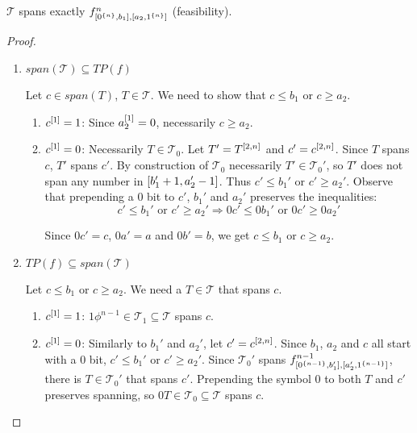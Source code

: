 \begin{theorem}
$\mathcal{T}$ spans exactly
$f^{n}_{[0^{\{n\}}, b_1], [a_2, 1^{\{n\}}]}$ (feasibility).
\end{theorem}

\begin{proof}

\hfill %
\begin{enumerate}
\item{$span(\mathcal{T}) \subseteq TP(f)$}

Let $c \in span(T)$, $T \in \mathcal{T}$.
We need to show that $c \leq b_1$ or $c \geq a_2$.

\begin{enumerate}
\item $c^{[1]} = 1$: Since $a_2^{[1]} = 0$,
necessarily $c \geq a_2$.

\item $c^{[1]} = 0$: Necessarily $T \in \mathcal{T}_0$.
Let $T' = T^{[2, n]}$ and $c' = c^{[2, n]}$.
Since $T$ spans $c$, $T'$ spans $c'$.
By construction of $\mathcal{T}_0$
necessarily $T' \in \mathcal{T}_0'$,
so $T'$ does not span any number
in $[b_1' + 1, a_2' - 1]$.
Thus $c' \leq b_1'$ or $c' \geq a_2'$.
Observe that prepending a $0$ bit
to $c'$, $b_1'$ and $a_2'$
preserves the inequalities:
\[
c' \leq b_1' \text{ or } c' \geq a_2'
\Rightarrow
0 c' \leq 0 b_1' \text{ or } 0 c' \geq 0 a_2'
\]

Since $0 c' = c$, $0 a' = a$ and $0 b' = b$,
we get $c \leq b_1$ or $c \geq a_2$.
\end{enumerate}

\item{$TP(f) \subseteq span(\mathcal{T})$}

Let $c \leq b_1$ or $c \geq a_2$.
We need a $T \in \mathcal{T}$ that spans $c$.

\begin{enumerate}
\item $c^{[1]} = 1$:
$1 \phi^{n-1} \in \mathcal{T}_1 \subseteq \mathcal{T}$
spans $c$.

\item $c^{[1]} = 0$:
Similarly to $b_1'$ and $a_2'$, let $c' = c^{[2, n]}$.
Since $b_1$, $a_2$ and $c$ all start with a $0$ bit,
$c' \leq b_1'$ or $c' \geq a_2'$.
Since $\mathcal{T}_0'$ spans
$f^{n-1}_{[0^{\{n-1\}}, b_1'], [a_2', 1^{\{n-1\}}]}$,
there is $T \in \mathcal{T}_0'$ that spans $c'$.
Prepending the symbol $0$ to both $T$ and $c'$
preserves spanning,
so $0 T \in \mathcal{T}_0 \subseteq \mathcal{T}$ spans $c$.
\end{enumerate}

\end{enumerate}
\end{proof}

